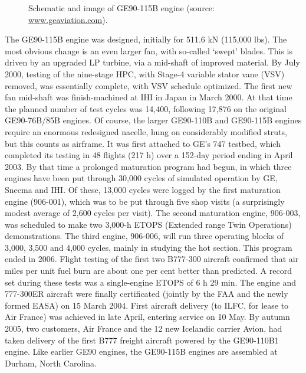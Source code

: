 \begin{figure}[!htb!]
 \centering
    \caption{\label{FIG_PW100_SCHEMATIC_FIG}Schematic and image of GE90-115B engine (source: \url{www.geaviation.com}).}
\end{figure}

The GE90-115B engine was designed, initially for 511.6 kN (115,000 lbs). The most obvious change is an even larger fan, with so-called `swept' blades. This is driven by an upgraded LP turbine, via a mid-shaft of improved material. By July 2000, testing of the nine-stage HPC, with Stage-4 variable stator vane (VSV) removed, was essentially complete, with VSV schedule optimized. The first new fan mid-shaft was finish-machined at IHI in Japan in March 2000. At that time the planned number of test cycles was 14,400, following 17,876 on the original GE90-76B/85B engines. Of course, the larger GE90-110B and GE90-115B engines require an enormous redesigned nacelle, hung on considerably modified struts, but this counts as airframe. It was first attached to GE's 747 testbed, which completed its testing in 48 flights (217 h) over a 152-day period ending in April 2003. By that time a prolonged maturation program had begun, in which three engines have been put through 30,000 cycles of simulated operation by GE, Snecma and IHI. Of these, 13,000 cycles were logged by the first maturation engine (906-001), which was to be put through five shop visits (a surprisingly modest average of 2,600 cycles per visit). The second maturation engine, 906-003, was scheduled to make two 3,000-h ETOPS (Extended range Twin Operations) demonstrations. The third engine, 906-006, will run three operating blocks of 3,000, 3,500 and 4,000 cycles, mainly in studying the hot section. This program ended in 2006. Flight testing of the first two B777-300 aircraft confirmed that air miles per unit fuel burn are about one per cent better than predicted. A record set during these tests was a single-engine ETOPS of 6 h 29 min. The engine and 777-300ER aircraft were finally certificated (jointly by the FAA and
the newly formed EASA) on 15 March 2004. First aircraft delivery (to ILFC, for lease to Air France) was achieved in late April, entering service on 10 May. By autumn 2005, two customers, Air France and the 12 new Icelandic carrier Avion, had taken delivery of the first B777 freight aircraft powered by the  GE90-110B1 engine. Like earlier GE90 engines, the GE90-115B engines are assembled at Durham, North Carolina. 

